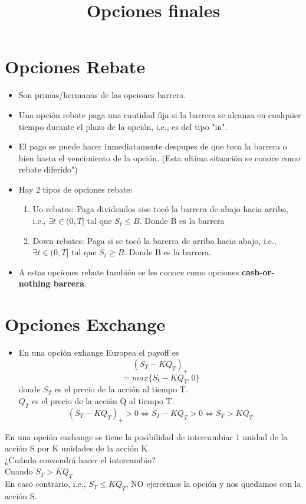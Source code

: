 \documentclass[12pts]{extarticle}
\author{}
\date{}
\title{Opciones finales}
\begin{document}
\maketitle 
\section{Opciones Rebate} 
\begin{itemize} 
\item Son primas/hermanas de las opciones barrera.
\item Una opción rebote paga una cantidad fija si la barrera se alcanza en cualquier tiempo durante el plazo de la opción, i.e., es del tipo "in".
\item El pago se puede hacer inmediatamente despupes de que toca la barrera o bien hasta el vencimiento de la opción. (Esta ultima situación se conoce como rebate diferido")
\item Hay 2 tipos de opciones rebate:
\begin{enumerate}
\item Uo rebates: Paga dividendos sise tocó la barrera de abajo hacia arriba, i.e., $\exists t \in (0, T]$ tal que $S_t \leq B$. Donde B es la barrera
\item Down rebates: Paga si se tocó la barerra de arriba hacia abajo, i.e., $\exists t \in (0, T]$ tal que $S_t \geq B$. Donde B es la barrera.
\end{enumerate}
\item A estas opciones rebate también se les conoce como opciones \textbf{cash-or-nothing barrera}.
\end{itemize} 
\section{Opciones Exchange}
\begin{itemize}
\item En una opción exhange Europea el payoff es $$(S_T-KQ_T)_+$$ $$=max\{S_t-KQ_T,0\}$$ donde $S_T$ es el precio de la acción al tiempo T. \\ $Q_T$ es el precio de la acción Q al tiempo T. $$(S_T-KQ_T)_+ > 0 \Leftrightarrow S_T-KQ_T > 0 \Leftrightarrow S_T > KQ_T$$ 
\end{itemize}
En una opción exchange se tiene la posibilidad de intercambiar 1 unidad de la acción S por K unidades de la acción K. \\
¿Cuándo convendrá hacer el intercambio?\\ Cuando $S_T > KQ_T$ \\ En caso contrario, i.e., $S_T\leq KQ_T$, NO ejercemos la opción y nos quedamos con la acción S. 
\end{document}
